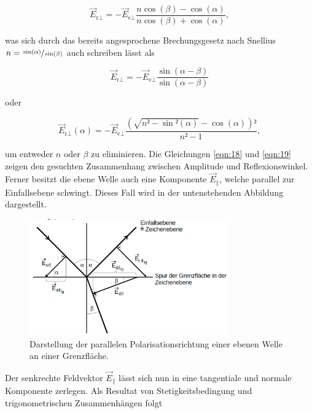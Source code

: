 \begin{equation*}
    \vec{E}_{\text{r}\perp} = -\vec{E}_{\text{e}\perp}\frac{n\cos(\beta)-\cos(\alpha)}{n\cos(\beta)+\cos(\alpha)},
\end{equation*}

\noindent was sich durch das bereits angesprochene Brechungsgesetz nach Snellius $n = \sfrac{\sin(\alpha)}{\sin(\beta)}$ auch schreiben lässt als

\begin{equation}
    \vec{E}_{\text{r}\perp} = -\vec{E}_{\text{e}\perp}\frac{\sin(\alpha-\beta)}{\sin(\alpha-\beta)}
    \label{eqn:18}
\end{equation}

oder 

\begin{equation}
    \vec{E}_{\text{r}\perp}(\alpha) = -\vec{E}_{\text{e}\perp}\frac{\left(\sqrt{n²-\sin²(\alpha)}-\cos(\alpha)\right)²}{n²-1},
    \label{eqn:19}
\end{equation}

\noindent um entweder $n$ oder $\beta$ zu eliminieren. Die Gleichungen \eqref{eqn:18} und \eqref{eqn:19} zeigen den gesuchten Zusammenhang zwischen 
Amplitude und Reflexionswinkel.\\

\noindent Ferner besitzt die ebene Welle auch eine Komponente $\vec{E}_\parallel$, welche parallel zur Einfallsebene schwingt. Dieses Fall wird in der 
untenstehenden Abbildung dargestellt.

\begin{figure}
    \centering
    \includegraphics[height=5cm]{content/senkPolar.png}
    \caption{Darstellung der parallelen Polarisationsrichtung einer ebenen Welle an einer Grenzfläche\cite{Versuchsanleitung_v407}.}
    \label{fig:senkrechtPolar}
\end{figure}

\noindent Der senkrechte Feldvektor $\vec{E}_\parallel$ lässt sich nun in eine tangentiale und normale Komponente zerlegen. Als Resultat von 
Stetigkeitsbedingung und trigonometrischen Zusammenhängen folgt 

